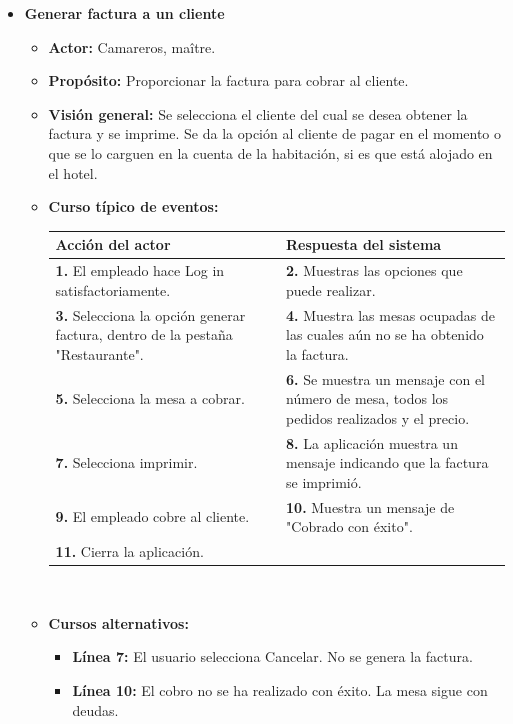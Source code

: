 \documentclass[spanish,a4paper,12pt]{report}		%
\begin{document}
\begin{itemize}
		\item \textbf{Generar factura a un cliente}
			\begin{itemize}
			\item \textbf{Actor:} Camareros, maître.
			\item \textbf{Propósito: } Proporcionar la factura para cobrar al cliente.
			\item \textbf{Visión general:} Se selecciona el cliente del cual se desea obtener la factura y se imprime. Se da la opción al cliente de pagar en el momento o que se lo carguen en la cuenta de la habitación, si es que está alojado en el hotel.
			\item \textbf{Curso típico de eventos:} 	\\
				\begin{tabular}{|p{6cm}||p{6cm}|}
				\hline
				\textbf{Acción del actor} & \textbf{Respuesta del sistema} \\ \hline \hline
				\textbf{1.}   El empleado hace Log in satisfactoriamente. & \textbf{2.} Muestras las opciones que puede realizar. \\ \hline
				\textbf{3.} Selecciona la opción generar factura, dentro de la pestaña "Restaurante". & \textbf{4.} Muestra las mesas ocupadas de las cuales aún no se ha obtenido la factura. \\ \hline
				\textbf{5.} Selecciona la mesa a cobrar.	& \textbf{6.} Se muestra un mensaje con el número de mesa, todos los pedidos realizados y el precio. \\ \hline
				\textbf{7.} Selecciona imprimir.	& \textbf{8.} La aplicación muestra un mensaje indicando que la factura se imprimió. \\ \hline
				\textbf{9.} El empleado cobre al cliente.	& \textbf{10.} Muestra un mensaje de "Cobrado con éxito". \\ \hline
				\textbf{11.} Cierra la aplicación. &  \\ \hline
			\end{tabular}
			\\
			\item \textbf{Cursos alternativos:} 
			\begin{itemize}
			\item  \textbf{Línea 7:} El usuario selecciona Cancelar. No se genera la factura.
			\item  \textbf{Línea 10:} El cobro no se ha realizado con éxito. La mesa sigue con deudas.
			\end {itemize}
		\end {itemize}
		

\end{itemize}
\end{document}
